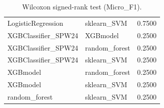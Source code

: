 \begin{table}[t]
\begin{tabular}{llr}
LogisticRegression & sklearn_SVM & 0.7500 \\
XGBClassifier_SPW24 & XGBmodel & 0.2500 \\
XGBClassifier_SPW24 & random_forest & 0.2500 \\
XGBClassifier_SPW24 & sklearn_SVM & 0.2500 \\
XGBmodel & random_forest & 0.2500 \\
XGBmodel & sklearn_SVM & 0.2500 \\
random_forest & sklearn_SVM & 0.2500 \\
\bottomrule
\end{tabular}
\caption{Wilcoxon signed-rank test (Micro_F1).}
\label{tab:wilcoxon_Micro_F1}
\end{table}